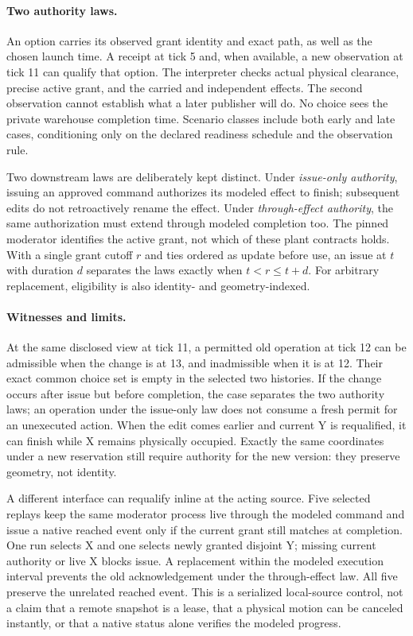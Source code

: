 \documentclass[11pt]{article}
\begin{document}
\paragraph{Two authority laws.}
An option carries its observed grant identity and exact path,
as well as the chosen launch time. A receipt at tick 5 and, when
available, a new observation at tick 11 can qualify that option.
The interpreter checks actual physical clearance, precise active
grant, and the carried and independent effects. The second
observation cannot establish what a later publisher will do.
No choice sees the private warehouse completion time. Scenario
classes include both early and late cases, conditioning only on
the declared readiness schedule and the observation rule.

Two downstream laws are deliberately kept distinct. Under
\emph{issue-only authority}, issuing an approved command authorizes
its modeled effect to finish; subsequent edits do not retroactively
rename the effect. Under \emph{through-effect authority}, the
same authorization must extend through modeled completion too.
The pinned moderator identifies the active grant, not which of these
plant contracts holds. With a single grant cutoff $r$ and ties
ordered as update before use, an issue at $t$ with duration $d$
separates the laws exactly when $t<r\leq t+d$. For arbitrary
replacement, eligibility is also identity- and geometry-indexed.

\paragraph{Witnesses and limits.}
At the same disclosed view at tick 11, a permitted old operation at
tick 12 can be admissible when the change is at 13, and inadmissible
when it is at 12. Their exact common choice set is empty in the
selected two histories. If the change occurs after issue but before
completion, the case separates the two authority laws; an operation
under the issue-only law does not consume a fresh permit for an
unexecuted action. When the edit comes earlier and current Y is
requalified, it can finish while X remains physically occupied.
Exactly the same coordinates under a new reservation still require
authority for the new version: they preserve geometry, not identity.

A different interface can requalify inline at the acting source.
Five selected replays keep the same moderator process live through
the modeled command and issue a native reached event only if the
current grant still matches at completion. One run selects X and one
selects newly granted disjoint Y; missing current authority or live X
blocks issue. A replacement within the modeled execution interval
prevents the old acknowledgement under the through-effect law. All
five preserve the unrelated reached event. This is a serialized
local-source control, not a claim that a remote snapshot is a lease,
that a physical motion can be canceled instantly, or that a native
status alone verifies the modeled progress.
\end{document}
